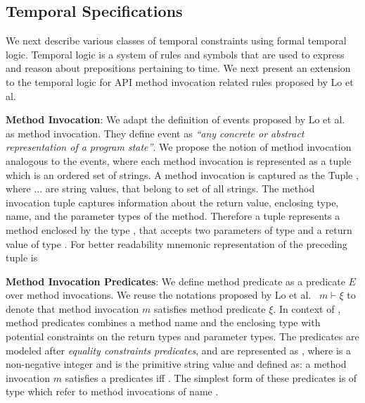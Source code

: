 \subsection{Temporal Specifications}
\label{sub:temporal}

We next describe various classes of temporal constraints using formal temporal logic.
Temporal logic is a system of rules and symbols that are used to express and reason about prepositions pertaining to time.
We next present an extension to the temporal logic for API method invocation related rules proposed by Lo et al.~\cite{lo2009mining}

\textbf{Method Invocation}: 
We adapt the definition of events proposed by Lo et al.~\cite{lo2009mining} as method invocation.
They define event as \textit{``any concrete or abstract representation of a program state''}. 
We propose the notion of method invocation analogous to the events,
where each method invocation is represented as a tuple which is an ordered set of strings. 
A method invocation is captured as the Tuple , where ... are string values,
that belong to set of all strings.
The method invocation tuple  captures information about the return value, enclosing type, name, and the parameter types of the method.
Therefore a tuple  represents a method  enclosed by the type ,
that accepts two parameters of type  and a return value of type . 
For better readability mnemonic representation of the preceding tuple is 


\textbf{Method Invocation Predicates}: We define method predicate as a predicate $E$ over method invocations.
We reuse the notations proposed by Lo et al.~\cite{lo2009mining} $m \vdash \xi$ to denote that method invocation $m$ satisfies method predicate $\xi$.
In context of \tool, method predicates combines a method name and the enclosing type with potential constraints on the return types and parameter types. 
The predicates are modeled after \textit{equality constraints predicates}, and are represented as , where  is a non-negative integer and  is the primitive string value and defined as: a method invocation $m$ satisfies a predicates  iff . The simplest form of these predicates is of type  which refer to method invocations of name .

